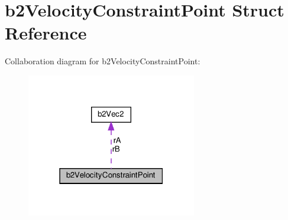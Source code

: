 \hypertarget{structb2VelocityConstraintPoint}{}\section{b2\+Velocity\+Constraint\+Point Struct Reference}
\label{structb2VelocityConstraintPoint}


Collaboration diagram for b2\+Velocity\+Constraint\+Point\+:
\nopagebreak
\begin{figure}[H]
\begin{center}
\leavevmode
\includegraphics[width=210pt]{structb2VelocityConstraintPoint__coll__graph}
\end{center}
\end{figure}
